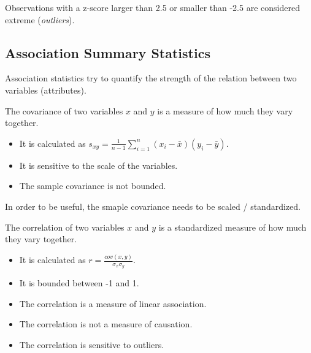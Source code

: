 \begin{remark}
    Observations with a z-score larger than 2.5 or smaller than -2.5 are considered extreme (\emph{outliers}).
\end{remark}

\subsection{Association Summary Statistics}
Association statistics try to quantify the strength of the relation between two variables (attributes).

\begin{definition}
    The covariance of two variables $x$ and $y$ is a measure of how much they vary together.
    \begin{itemize}
        \item It is calculated as $s_{xy} = \displaystyle\frac{1}{n-1}\sum_{i=1}^{n}(x_i-\bar{x})(y_i-\bar{y})$.
        \item It is sensitive to the scale of the variables.
        \item The sample covariance is not bounded.
    \end{itemize}
\end{definition}

In order to be useful, the smaple covariance needs to be scaled / standardized.

\begin{definition}
    The correlation of two variables $x$ and $y$ is a standardized measure of how much they vary together.
    \begin{itemize}
        \item It is calculated as $r = \displaystyle\frac{cov(x,y)}{\sigma_x\sigma_y}$.
        \item It is bounded between -1 and 1.
    \end{itemize}
\end{definition}

\begin{remark}
    
    \begin{itemize}
        \item The correlation is a measure of linear association.
        \item The correlation is not a measure of causation.
        \item The correlation is sensitive to outliers.
    \end{itemize}

\end{remark}

